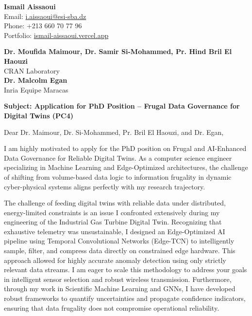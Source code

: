\documentclass[11pt,a4paper]{article}
\begin{document}
\thispagestyle{empty}

\begin{flushright}
\textbf{Ismail Aissaoui} \\
Email: \href{mailto:i.aissaoui@esi-sba.dz}{i.aissaoui@esi-sba.dz} \\
Phone: +213 660 70 77 96 \\
Portfolio: \href{https://ismail-aissaoui.vercel.app}{ismail-aissaoui.vercel.app}
\end{flushright}

\vspace{1em}

\begin{flushleft}
\textbf{Dr. Moufida Maimour, Dr. Samir Si-Mohammed, Pr. Hind Bril El Haouzi} \\
CRAN Laboratory \\
\textbf{Dr. Malcolm Egan} \\
Inria Equipe Maracas
\end{flushleft}

\vspace{1em}
\noindent\textbf{Subject: Application for PhD Position -- Frugal Data Governance for Digital Twins (PC4)}
\vspace{1em}

\noindent Dear Dr. Maimour, Dr. Si-Mohammed, Pr. Bril El Haouzi, and Dr. Egan,

\vspace{1em}
\noindent
I am highly motivated to apply for the PhD position on Frugal and AI-Enhanced Data Governance for Reliable Digital Twins. As a computer science engineer specializing in Machine Learning and Edge-Optimized architectures, the challenge of shifting from volume-based data logic to information frugality in dynamic cyber-physical systems aligns perfectly with my research trajectory.

\vspace{0.5em}
\noindent
The challenge of feeding digital twins with reliable data under distributed, energy-limited constraints is an issue I confronted extensively during my engineering of the Industrial Gas Turbine Digital Twin. Recognizing that exhaustive telemetry was unsustainable, I designed an Edge-Optimized AI pipeline using Temporal Convolutional Networks (Edge-TCN) to intelligently sample, filter, and compress data directly on constrained edge hardware. This approach allowed for highly accurate anomaly detection using only strictly relevant data streams. I am eager to scale this methodology to address your goals in intelligent sensor selection and robust wireless transmission. Furthermore, through my work in Scientific Machine Learning and GNNs, I have developed robust frameworks to quantify uncertainties and propagate confidence indicators, ensuring that data frugality does not compromise operational reliability.
\end{document}
